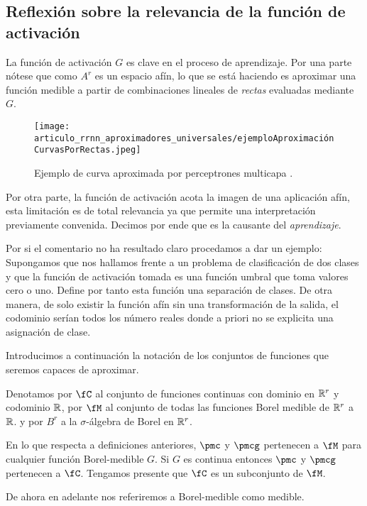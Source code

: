 \subsection{ Reflexión sobre la relevancia de la función de activación}  

La función de activación $G$ es clave en el proceso de aprendizaje.
Por una parte nótese que como $A^r$ es un espacio afín, lo que se está haciendo es 
aproximar una función medible a partir de combinaciones lineales de \textit{rectas} evaluadas mediante $G$. 
 
\begin{figure}[h!]
    \texttt{[image: articulo\_rrnn\_aproximadores\_universales/ejemploAproximaciónCurvasPorRectas.jpeg]}
    \caption{Ejemplo de curva aproximada por perceptrones multicapa \cite{alma991008058419704990}.}
    \label{img:def_esenciales_ejemplo_curva_aproximada_percentrón_multicapa}
\end{figure}

Por otra parte, la función de activación acota la imagen de una aplicación afín, esta limitación 
es de total relevancia ya que permite una interpretación previamente convenida. 
Decimos por ende que es la causante del \textit{aprendizaje}.     

Por si el comentario no ha resultado claro procedamos a dar un ejemplo:   
Supongamos que nos hallamos frente a un problema de clasificación de dos clases y que la función de activación
tomada es una función umbral que toma valores cero o uno. Define por tanto esta función una separación de clases. 
De otra manera, de solo existir la función afín sin una transformación de la salida, el codominio serían 
todos los número reales donde a priori no se explicita una asignación de clase.  

Introducimos a continuación la notación de los conjuntos de funciones que seremos capaces de aproximar.  

Denotamos por  $\fC$ al conjunto de funciones continuas con dominio en $\mathbb{R}^r$ y codominio $\mathbb{R}$,
por  $\fM$ al conjunto de todas las funciones Borel medible de $\mathbb{R}^r$ a $\mathbb{R}$. 
y por $B^r$ a la $\sigma$-álgebra de Borel en $\mathbb{R} ^r$. 

En lo que respecta a definiciones anteriores, $\pmc$ y $\pmcg$ pertenecen a 
$\fM$ para cualquier función Borel-medible $G$. Si $G$ es continua entonces 
$\pmc$ y $\pmcg$ pertenecen a $\fC$. Tengamos presente que $\fC$ es un subconjunto
de $\fM$.  

De ahora en adelante nos referiremos a Borel-medible como medible. 
  

